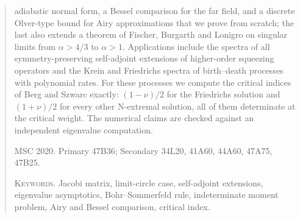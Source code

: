 \documentclass[12pt,letterpaper]{article}
\theoremstyle{esmath-tier3}
\begin{document}
\begin{quote}
adiabatic normal form, a Bessel comparison for the far field, and a discrete Olver-type bound for Airy
approximations that we prove from scratch; the last also extends a theorem of Fischer, Burgarth and
Lonigro on singular limits from $\alpha>4/3$ to $\alpha>1$. Applications include the spectra of all
symmetry-preserving self-adjoint extensions of higher-order squeezing operators and the Krein and
Friedrichs spectra of birth--death processes with polynomial rates. For these processes we compute the
critical indices of Berg and Szwarc exactly: $(1-\nu)/2$ for the Friedrichs solution and $(1+\nu)/2$
for every other N-extremal solution, all of them determinate at the critical weight. The numerical
claims are checked against an independent eigenvalue computation.

\medskip\noindent\textsc{MSC 2020.} Primary 47B36; Secondary 34L20, 41A60, 44A60, 47A75, 47B25.

\noindent\textsc{Keywords.} Jacobi matrix, limit-circle case, self-adjoint extensions, eigenvalue
asymptotics, Bohr--Sommerfeld rule, indeterminate moment problem, Airy and Bessel comparison,
critical index.
\end{quote}



















\end{document}
